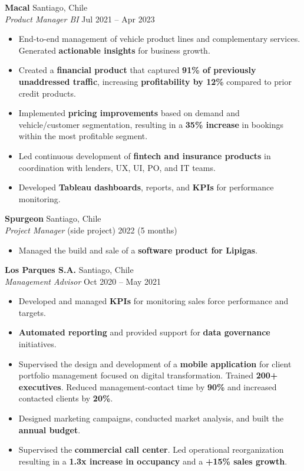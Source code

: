 \documentclass[a4paper,10.5pt]{extarticle}
\begin{document}
\textbf{Macal} \hfill Santiago, Chile\\
\textit{Product Manager BI} \hfill Jul 2021 -- Apr 2023
\begin{itemize}
    \item End-to-end management of vehicle product lines and complementary services. Generated \textbf{actionable insights} for business growth.
    \item Created a \textbf{financial product} that captured \textbf{91\% of previously unaddressed traffic}, increasing \textbf{profitability by 12\%} compared to prior credit products.
    \item Implemented \textbf{pricing improvements} based on demand and vehicle/customer segmentation, resulting in a \textbf{35\% increase} in bookings within the most profitable segment.
    \item Led continuous development of \textbf{fintech and insurance products} in coordination with lenders, UX, UI, PO, and IT teams.
    \item Developed \textbf{Tableau dashboards}, reports, and \textbf{KPIs} for performance monitoring.
\end{itemize}

\vspace{4pt}

\textbf{Spurgeon} \hfill Santiago, Chile\\
\textit{Project Manager} (side project) \hfill 2022 (5 months)
\begin{itemize}
    \item Managed the build and sale of a \textbf{software product for Lipigas}.
\end{itemize}

\vspace{4pt}

\textbf{Los Parques S.A.} \hfill Santiago, Chile\\
\textit{Management Advisor} \hfill Oct 2020 -- May 2021
\begin{itemize}
    \item Developed and managed \textbf{KPIs} for monitoring sales force performance and targets.
    \item \textbf{Automated reporting} and provided support for \textbf{data governance} initiatives.
    \item Supervised the design and development of a \textbf{mobile application} for client portfolio management focused on digital transformation. Trained \textbf{200+ executives}. Reduced management-contact time by \textbf{90\%} and increased contacted clients by \textbf{20\%}.
    \item Designed marketing campaigns, conducted market analysis, and built the \textbf{annual budget}.
    \item Supervised the \textbf{commercial call center}. Led operational reorganization resulting in a \textbf{1.3x increase in occupancy} and a \textbf{+15\% sales growth}.
\end{itemize}
\end{document}
